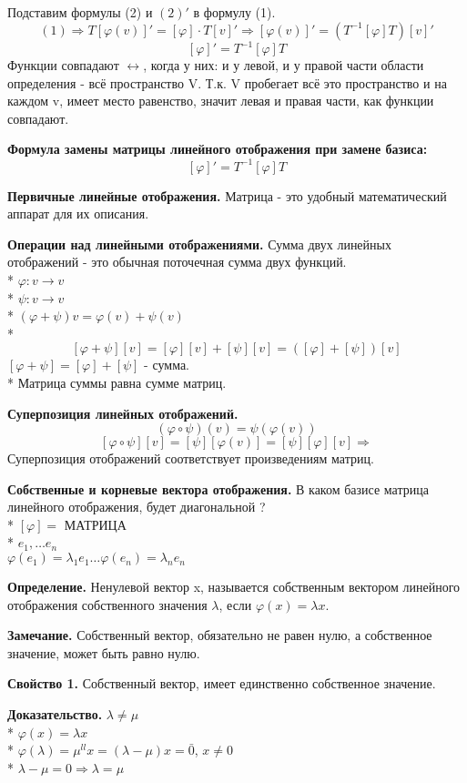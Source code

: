 \documentclass{article}
\begin{document}
Подставим формулы (2) и $(2)'$ в формулу (1).
$$(1)\Rightarrow T[\varphi(v)]'=[\varphi]\cdot T[v]'\Rightarrow[\varphi(v)]'=(T^{-1}[\varphi]T)[v]'$$
$$[\varphi]'=T^{-1}[\varphi]T$$
Функции совпадают $\leftrightarrow$, когда у них: и у левой, и у правой части области определения - всё пространство V. Т.к. V пробегает всё это пространство и на каждом v, имеет место равенство, значит левая и правая части, как функции совпадают.

{\bf Формула замены матрицы линейного отображения при замене базиса:}
$$[\varphi]'=T^{-1}[\varphi]T$$

{\bf Первичные линейные отображения.} Матрица - это удобный математический аппарат для их описания.

{\bf Операции над линейными отображениями.} Сумма двух линейных отображений - это обычная поточечная сумма двух функций.\\*
$\varphi: v \to v$\\*
$\psi: v \to v$\\*
$(\varphi + \psi)v=\varphi(v)+\psi(v)$\\*
$$[\varphi+\psi][v]=[\varphi][v]+[\psi][v]=([\varphi]+[\psi])[v]$$
$[\varphi+\psi]=[\varphi]+[\psi]$ - сумма.\\*
Матрица суммы равна сумме матриц. 

{\bf Суперпозиция линейных отображений.}
$$(\varphi \circ \psi)(v)=\psi(\varphi(v))$$
$$[\varphi \circ \psi][v]=[\psi][\varphi(v)]=[\psi][\varphi][v] \Rightarrow$$
Суперпозиция отображений соответствует произведениям матриц.

{\bf Собственные и корневые вектора отображения.} В каком базисе матрица линейного отображения, будет диагональной ?\\*
$[\varphi]=$ МАТРИЦА\\*
$e_1,\ldots e_n$\\\*
$\varphi(e_1)=\lambda_1e_1\ldots\varphi(e_n)=\lambda_ne_n$

{\bf Определение.} Ненулевой вектор x, называется собственным вектором линейного отображения собственного значения $\lambda$, если $\varphi(x)=\lambda x$.

{\bf Замечание.} Собственный вектор, обязательно не равен нулю, а собственное значение, может быть равно нулю.

{\bf Свойство 1.} Собственный вектор, имеет единственно собственное значение.

{\bf Доказательство.} $\lambda\ne \mu$\\*
$\varphi(x)=\lambda x$\\*
$\varphi(\lambda)=\mu^{ll}x=(\lambda-\mu)x=\bar{0}$, $x\ne 0$\\*
$\lambda-\mu=0\Rightarrow\lambda=\mu$
\end{document}
